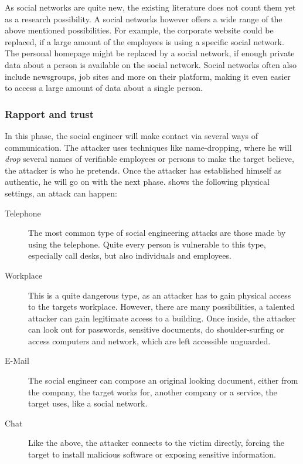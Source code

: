 As social networks are quite new, the existing literature does not count them
yet as a research possibility. A social networks however offers a wide range of
the above mentioned possibilities. For example, the corporate website could be
replaced, if a large amount of the employees is using a specific social
network. The personal homepage might be replaced by a social network, if enough
private data about a person is available on the social network. Social networks
often also include newsgroups, job sites and more on their platform, making it
even easier to access a large amount of data about a single person.


\subsubsection{Rapport and trust}

In this phase, the social engineer will make contact via several ways of
communication. The attacker uses techniques like name-dropping, where he will
\textit{drop} several names of verifiable employees or persons to make the target
believe, the attacker is who he pretends. Once the attacker has established
himself as authentic, he will go on with the next phase. \cite{jones2004} shows
the following physical settings, an attack can happen:

\begin{description}
\item[Telephone] The most common type of social engineering attacks are those
  made by using the telephone. Quite every person is vulnerable to this type,
  especially call desks, but also individuals and employees.
\item[Workplace] This is a quite dangerous type, as an attacker has to gain
  physical access to the targets workplace. However, there are many
  possibilities, a talented attacker can gain legitimate access to a building.
  Once inside, the attacker can look out for passwords, sensitive documents,
  do shoulder-surfing or access computers and network, which are left
  accessible unguarded.
\item[E-Mail] The social engineer can compose an original looking document,
  either from the company, the target works for, another company or a service,
  the target uses, like a social network.
\item[Chat] Like the above, the attacker connects to the victim directly,
  forcing the target to install malicious software or exposing sensitive
  information.
\end{description}

